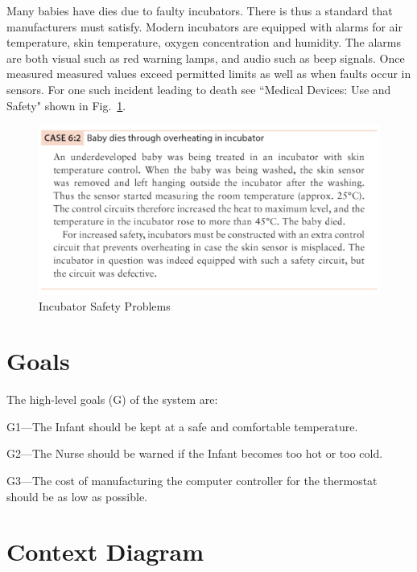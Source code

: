 \documentclass[fontsize=12pt,paper=letter,twoside]{scrartcl}
\begin{document}
Many babies have dies due to faulty incubators. There is thus a standard that manufacturers must satisfy. Modern incubators are equipped with alarms for air temperature, skin temperature, oxygen concentration and humidity. The alarms are both visual such as red warning lamps, and audio such as beep signals. Once measured measured values exceed permitted limits as well as when faults occur in sensors. For one such incident leading to death see ``Medical Devices: Use and Safety" shown in Fig.~\ref{fig:incubator}. 

\begin{figure}[!htb]
\begin{center}
\includegraphics[width=.9\textwidth]{images/incubator.png}
\end{center}
\caption{Incubator Safety Problems \cite[p98]{JM2007}}
\label{fig:incubator}
\end{figure}

\section{Goals}

The high-level goals (G) of the system are:

\begin{mylist}
\item G1---The Infant should be kept at a safe and comfortable temperature.

\item G2---The Nurse should be warned if the Infant becomes too hot or too cold.

\item G3---The cost of manufacturing the computer controller for the thermostat should be as low as possible.
\end{mylist}


\newpage
\section{Context Diagram}
\end{document}
